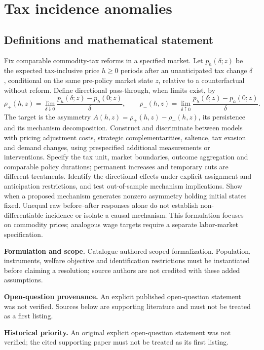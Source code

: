 \documentclass[11pt]{article}
\begin{document}
\section*{Tax incidence anomalies}\label{30007758}
\subsection{Definitions and mathematical statement}
Fix comparable commodity-tax reforms in a specified market. Let \(p_h(\delta;z)\) be the expected tax-inclusive price \(h\geq0\) periods after an unanticipated tax change \(\delta\), conditional on the same pre-policy market state \(z\), relative to a counterfactual without reform. Define directional pass-through, when limits exist, by
\[\rho_+(h,z)=\lim_{\delta\downarrow0}\frac{p_h(\delta;z)-p_h(0;z)}{\delta},\qquad \rho_-(h,z)=\lim_{\delta\uparrow0}\frac{p_h(\delta;z)-p_h(0;z)}{\delta}.\]
The target is the asymmetry \(A(h,z)=\rho_+(h,z)-\rho_-(h,z)\), its persistence and its mechanism decomposition. Construct and discriminate between models with pricing adjustment costs, strategic complementarities, salience, tax evasion and demand changes, using prespecified additional measurements or interventions. Specify the tax unit, market boundaries, outcome aggregation and comparable policy durations; permanent increases and temporary cuts are different treatments. Identify the directional effects under explicit assignment and anticipation restrictions, and test out-of-sample mechanism implications. Show when a proposed mechanism generates nonzero asymmetry holding initial states fixed. Unequal raw before–after responses alone do not establish non-differentiable incidence or isolate a causal mechanism. This formulation focuses on commodity prices; analogous wage targets require a separate labor-market specification.

\par\textbf{Formulation and scope.} Catalogue-authored scoped formalization. Population, instruments, welfare objective and identification restrictions must be instantiated before claiming a resolution; source authors are not credited with these added assumptions.

\par\textbf{Open-question provenance.} An explicit published open-question statement was not verified. Sources below are supporting literature and must not be treated as a first listing.

\par\textbf{Historical priority.} An original explicit open-question statement was not verified; the cited supporting paper must not be treated as its first listing.
\end{document}
